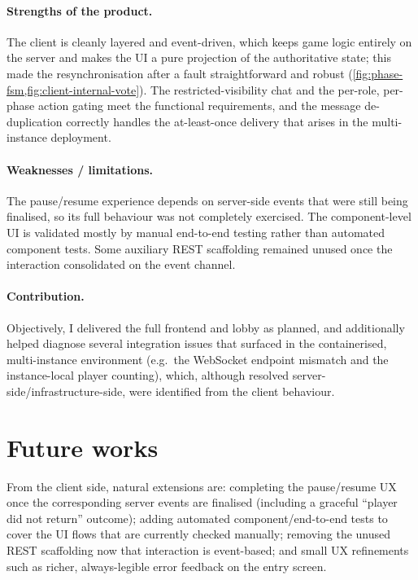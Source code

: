 \documentclass{scrartcl}
\begin{document}
\paragraph{Strengths of the product.} The client is cleanly layered and
event-driven, which keeps game logic entirely on the server and makes
the UI a pure projection of the authoritative state; this made the
resynchronisation after a fault straightforward and robust
(\cref{fig:phase-fsm,fig:client-internal-vote}). The restricted-visibility
chat and the per-role, per-phase action gating meet the functional
requirements, and the message de-duplication correctly handles the
at-least-once delivery that arises in the multi-instance deployment.

\paragraph{Weaknesses / limitations.} The pause/resume experience
depends on server-side events that were still being finalised, so its
full behaviour was not completely exercised. The component-level UI is
validated mostly by manual end-to-end testing rather than automated
component tests. Some auxiliary REST scaffolding remained unused once
the interaction consolidated on the event channel.

\paragraph{Contribution.} Objectively, I delivered the full frontend and
lobby as planned, and additionally helped diagnose several integration
issues that surfaced in the containerised, multi-instance environment
(e.g.\ the WebSocket endpoint mismatch and the instance-local player
counting), which, although resolved server-side/infrastructure-side,
were identified from the client behaviour.

\section{Future works}\label{future-works}

From the client side, natural extensions are: completing the
pause/resume UX once the corresponding server events are finalised
(including a graceful ``player did not return'' outcome); adding
automated component/end-to-end tests to cover the UI flows that are
currently checked manually; removing the unused REST scaffolding now
that interaction is event-based; and small UX refinements such as
richer, always-legible error feedback on the entry screen.
\end{document}
